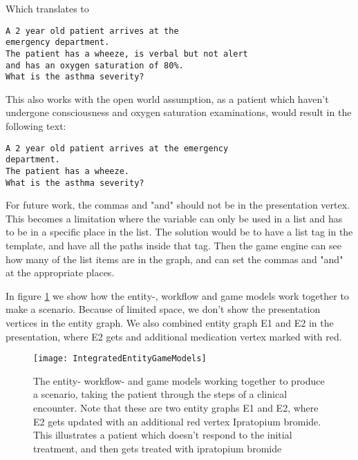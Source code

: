 Which translates to 
\begin{lstlisting}[caption={Question instantiation}, frame=single, captionpos=b] 
A 2 year old patient arrives at the 
emergency department. 
The patient has a wheeze, is verbal but not alert 
and has an oxygen saturation of 80%. 
What is the asthma severity? 
\end{lstlisting}

This also works with the open world assumption, as a patient which haven't undergone consciousness and oxygen saturation examinations, would result in the following text:

\begin{lstlisting}[caption={Question instantiation}, frame=single, captionpos=b] 
A 2 year old patient arrives at the emergency 
department. 
The patient has a wheeze. 
What is the asthma severity? 
\end{lstlisting}

For future work, the commas and "and" should not be in the presentation vertex. This becomes a limitation where the variable can only be used in a list and has to be in a specific place in the list. The solution would be to have a list tag in the template, and have all the paths inside that tag. Then the game engine can see how many of the list items are in the graph, and can set the commas and "and" at the appropriate places.

In figure \ref{fig:IntegratedEntityGamelModels} we show how the entity-, workflow and game models work together to make a scenario. Because of limited space, we don't show the presentation vertices in the entity graph. We also combined entity graph E1 and E2 in the presentation, where E2 gets and additional medication vertex marked with red. 

\begin{figure}[h!]
	\texttt{[image: IntegratedEntityGameModels]}
	\caption {The entity- workflow- and game models working together to produce a scenario, taking the patient through the steps of a clinical encounter. Note that these are two entity graphs E1 and E2, where E2 gets updated with an additional red vertex Ipratopium bromide. This illustrates a patient which doesn't respond to the initial treatment, and then gets treated with ipratopium bromide}
	\label{fig:IntegratedEntityGamelModels}
\end{figure}

